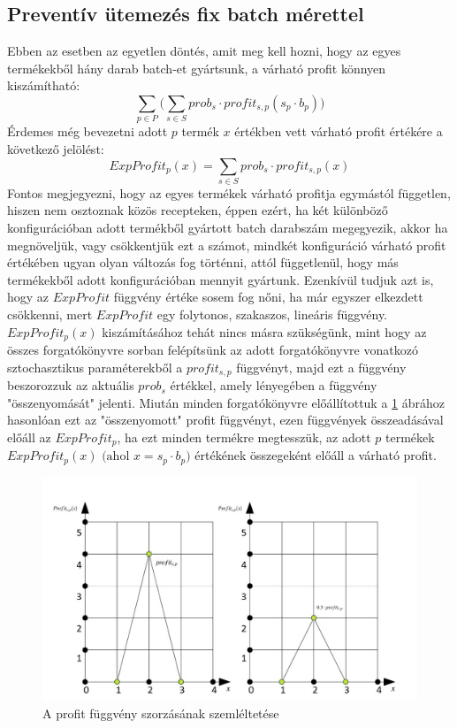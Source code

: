 \documentclass [12pt]{report}
\begin{document}
\subsection{Preventív ütemezés fix batch mérettel}
Ebben az esetben az egyetlen döntés, amit meg kell hozni, hogy az egyes termékekből hány darab batch-et gyártsunk, a várható profit könnyen kiszámítható:
$$\sum_{p \in P}\bigg (\sum_{s \in S} prob_s \cdot profit_{s,p} (s_p \cdot b_p)\bigg)$$
Érdemes még bevezetni adott $p$ termék $x$ értékben vett várható profit értékére a következő jelölést:
$$ExpProfit_p(x)=\sum_{s \in S}prob_s \cdot profit_{s,p}(x)$$
Fontos megjegyezni, hogy az egyes termékek várható profitja egymástól független, hiszen nem osztoznak közös recepteken, éppen ezért, ha két különböző konfigurációban adott termékből gyártott batch darabszám megegyezik, akkor ha megnöveljük, vagy csökkentjük ezt a számot, mindkét konfiguráció várható profit értékében ugyan olyan változás fog történni, attól függetlenül, hogy más termékekből adott konfigurációban mennyit gyártunk.
Ezenkívül tudjuk azt is, hogy az $ExpProfit$ függvény értéke sosem fog nőni, ha már egyszer elkezdett csökkenni, mert $ExpProfit$ egy folytonos, szakaszos, lineáris függvény. \cite{phd_Hegyhati}
$ExpProfit_p(x)$ kiszámításához tehát nincs másra szükségünk, mint hogy az összes forgatókönyvre sorban felépítsünk az adott forgatókönyvre vonatkozó sztochasztikus paraméterekből a $profit_{s,p}$ függvényt, majd ezt a függvény beszorozzuk az aktuális $prob_s$ értékkel, amely lényegében a függvény "összenyomását" jelenti. Miután minden forgatókönyvre előállítottuk a \ref{profit_func_prob} ábrához hasonlóan ezt az "összenyomott" profit függvényt, ezen függvények összeadásával előáll az $ExpProfit_p$, ha ezt minden termékre megtesszük, az adott $p$ termékek $ExpProfit_p(x) \text{ (ahol }x=s_p \cdot b_p)$ értékének összegeként előáll a várható profit.
\pagebreak
\begin{figure}
\begin{center}
\includegraphics[scale=0.5]{profit_func_prob}
\caption{A profit függvény szorzásának szemléltetése}
\label{profit_func_prob}
\end{center}
\end{figure}
\end{document}
